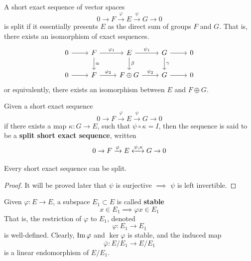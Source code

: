   \begin{proposition}
    A short exact sequence of vector spaces
    \begin{equation}
      0 \xrightarrow{} F \xrightarrow{\varphi} E \xrightarrow{\psi} G \xrightarrow{} 0
    \end{equation}
    is split if it essentially presents $E$ as the direct sum of groups $F$ and $G$. That is, there exists an isomorphism of exact sequences.
    \[\begin{tikzcd}
        0 \arrow{r} & F \arrow{d}{\alpha} \arrow{r}{\varphi_1} & E \arrow{d}{\beta} \arrow{r}{\psi_1} & G \arrow{d}{\gamma} \arrow{r} & 0 \\
        0 \arrow{r} & F \arrow{r}{\varphi_2} & F \oplus G \arrow{r}{\psi_2} & G \arrow{r} & 0 
    \end{tikzcd}\]
    or equivalently, there exists an isomorphism between $E$ and $F \oplus G$. 
  \end{proposition}

  \begin{definition}
    Given a short exact sequence
    \begin{equation}
      0 \xrightarrow{} F \xrightarrow{\varphi} E \xrightarrow{\psi} G \xrightarrow{} 0
    \end{equation}
    if there exists a map $\kappa: G \longrightarrow E$, such that $ \psi \circ \kappa = I$, then the sequence is said to be a \textbf{split short exact sequence}, written
    \begin{equation}
      0 \xrightarrow{} F \xrightarrow{\varphi} E \xleftrightarrow{\psi, \kappa} G \xrightarrow{} 0
    \end{equation}
  \end{definition}

  \begin{proposition}
    Every short exact sequence can be split. 
  \end{proposition}
  \begin{proof}
    It will be proved later that $\psi$ is surjective $\implies$ $\psi$ is left invertible. 
  \end{proof}

  \begin{definition}
    Given $\varphi: E \longrightarrow E$, a subspace $E_1 \subset E$ is called \textbf{stable} 
    \begin{equation}
      x \in E_1 \implies \varphi x \in E_1
    \end{equation}
    That is, the restriction of $\varphi$ to $E_1$, denoted
    \begin{equation}
      \varphi: E_1 \longrightarrow E_1
    \end{equation}
    is well-defined. Clearly, $\im{\varphi}$ and $\ker{\varphi}$ is stable, and the induced map 
    \begin{equation}
      \bar{\varphi}: E / E_1 \longrightarrow E / E_1
    \end{equation}
    is a linear endomorphism of $E / E_1$. 
  \end{definition}

